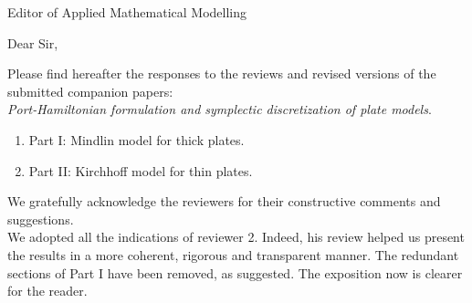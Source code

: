 \documentclass[pdftex,a4paper,12pt,origdate]{letter}
\begin{document}

\begin{letter}{Editor of Applied Mathematical Modelling}



\opening{Dear  Sir,}


Please find hereafter the responses to the reviews and revised versions of the submitted companion papers:\\


{\em Port-Hamiltonian formulation and symplectic discretization of plate models}.
\vspace{-5mm}
\begin{enumerate}
\item Part I: Mindlin model for thick plates.
\item Part II: Kirchhoff model for thin plates.
\end{enumerate}

We gratefully acknowledge the reviewers for their constructive comments and suggestions. \\

We adopted all the indications of reviewer 2. Indeed, his review helped us present the
results in a more coherent, rigorous and transparent manner. The redundant sections
of Part I have been removed, as suggested. The exposition now is clearer for the
reader. \\


\end{letter}
\end{document}
